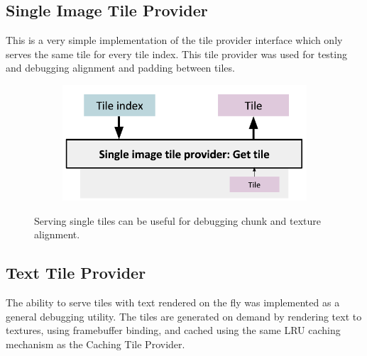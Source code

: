 \subsection{Single Image Tile Provider}
This is a very simple implementation of the tile provider interface which only serves the same tile for every tile index. This tile provider was used for testing and debugging alignment and padding between tiles.

\begin{figure}[htbp]
    \centering
    \begin{subfigure}[bt]{0.6\textwidth}
        \includegraphics[width=\textwidth]{figures/implementation/tileprovider/singleimagetileprovider_gettile.pdf}
    \end{subfigure}
    \caption{Serving single tiles can be useful for debugging chunk and texture alignment.}
    \label{fig:singleimagetileprovider_gettile}
\end{figure}

\subsection{Text Tile Provider}
The ability to serve tiles with text rendered on the fly was implemented as a general debugging utility. The tiles are generated on demand by rendering text to textures, using framebuffer binding, and cached using the same LRU caching mechanism as the Caching Tile Provider.

